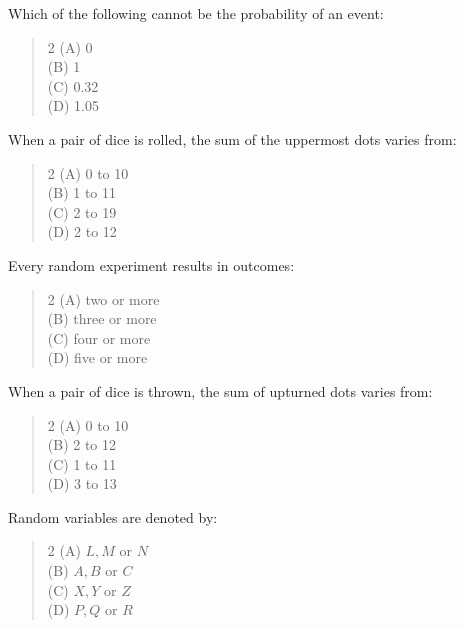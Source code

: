 \documentclass[11pt,a4paper]{article}
\begin{document}
\begin{mcqlist}
\item Which of the following cannot be the probability of an event:
\begin{quote}\begin{multicols}{2}
\noindent (A) 0 \\
(B) 1 \\
(C) 0.32 \\
(D) 1.05
\end{multicols}\end{quote}

\item When a pair of dice is rolled, the sum of the uppermost dots varies from:
\begin{quote}\begin{multicols}{2}
\noindent (A) 0 to 10 \\
(B) 1 to 11 \\
(C) 2 to 19 \\
(D) 2 to 12
\end{multicols}\end{quote}

\item Every random experiment results in outcomes:
\begin{quote}\begin{multicols}{2}
\noindent (A) two or more \\
(B) three or more \\
(C) four or more \\
(D) five or more
\end{multicols}\end{quote}

\item When a pair of dice is thrown, the sum of upturned dots varies from:
\begin{quote}\begin{multicols}{2}
\noindent (A) 0 to 10 \\
(B) 2 to 12 \\
(C) 1 to 11 \\
(D) 3 to 13
\end{multicols}\end{quote}

\item Random variables are denoted by:
\begin{quote}\begin{multicols}{2}
\noindent (A) $L, M$ or $N$ \\
(B) $A, B$ or $C$ \\
(C) $X, Y$ or $Z$ \\
(D) $P, Q$ or $R$
\end{multicols}\end{quote}


\end{mcqlist}
\end{document}
